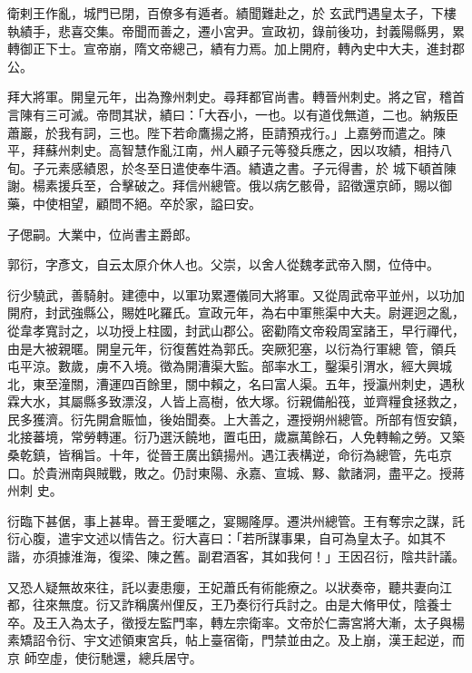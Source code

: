 \begin{pinyinscope}
 衛剌王作亂，城門已閉，百僚多有遁者。績聞難赴之，於
 玄武門遇皇太子，下樓執績手，悲喜交集。帝聞而善之，遷小宮尹。宣政初，錄前後功，封義陽縣男，累轉御正下士。宣帝崩，隋文帝總己，績有力焉。加上開府，轉內史中大夫，進封郡公。



 拜大將軍。開皇元年，出為豫州刺史。尋拜都官尚書。轉晉州刺史。將之官，稽首言陳有三可滅。帝問其狀，績曰：「大吞小，一也。以有道伐無道，二也。納叛臣蕭巖，於我有詞，三也。陛下若命鷹揚之將，臣請預戎行。」上嘉勞而遣之。陳平，拜蘇州刺史。高智慧作亂江南，州人顧子元等發兵應之，因以攻績，相持八旬。子元素感績恩，於冬至日遣使奉牛酒。績遺之書。子元得書，於
 城下頓首陳謝。楊素援兵至，合擊破之。拜信州總管。俄以病乞骸骨，詔徵還京師，賜以御藥，中使相望，顧問不絕。卒於家，謚曰安。



 子偲嗣。大業中，位尚書主爵郎。



 郭衍，字彥文，自云太原介休人也。父崇，以舍人從魏孝武帝入關，位侍中。



 衍少驍武，善騎射。建德中，以軍功累遷儀同大將軍。又從周武帝平並州，以功加開府，封武強縣公，賜姓叱羅氏。宣政元年，為右中軍熊渠中大夫。尉遲迥之亂，從韋孝寬討之，以功授上柱國，封武山郡公。密勸隋文帝殺周室諸王，早行禪代，由是大被親暱。開皇元年，衍復舊姓為郭氏。突厥犯塞，以衍為行軍總
 管，領兵屯平涼。數歲，虜不入境。徵為開漕渠大監。部率水工，鑿渠引渭水，經大興城北，東至潼關，漕運四百餘里，關中賴之，名曰富人渠。五年，授瀛州刺史，遇秋霖大水，其屬縣多致漂沒，人皆上高樹，依大塚。衍親備船筏，並齊糧食拯救之，民多獲濟。衍先開倉賑恤，後始聞奏。上大善之，遷授朔州總管。所部有恆安鎮，北接蕃境，常勞轉運。衍乃選沃饒地，置屯田，歲嬴萬餘石，人免轉輸之勞。又築桑乾鎮，皆稱旨。十年，從晉王廣出鎮揚州。遇江表構逆，命衍為總管，先屯京口。於貴洲南與賊戰，敗之。仍討東陽、永嘉、宣城、黟、歙諸洞，盡平之。授蔣州刺
 史。



 衍臨下甚倨，事上甚卑。晉王愛暱之，宴賜隆厚。遷洪州總管。王有奪宗之謀，託衍心腹，遣宇文述以情告之。衍大喜曰：「若所謀事果，自可為皇太子。如其不諧，亦須據淮海，復梁、陳之舊。副君酒客，其如我何！」王因召衍，陰共計議。



 又恐人疑無故來往，託以妻患癭，王妃蕭氏有術能療之。以狀奏帝，聽共妻向江都，往來無度。衍又詐稱廣州俚反，王乃奏衍行兵討之。由是大脩甲仗，陰養士卒。及王入為太子，徵授左監門率，轉左宗衛率。文帝於仁壽宮將大漸，太子與楊素矯詔令衍、宇文述領東宮兵，帖上臺宿衛，門禁並由之。及上崩，漢王起逆，而京
 師空虛，使衍馳還，總兵居守。




\end{pinyinscope}
